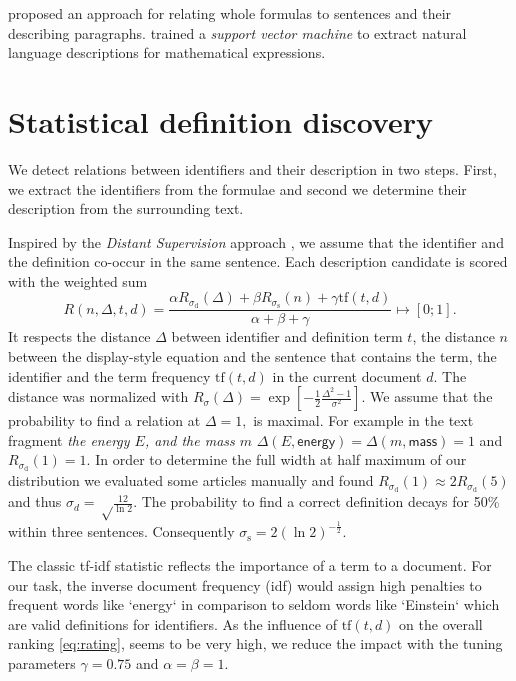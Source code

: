 \documentclass[runningheads]{llncs}
\begin{document}
\citeauthor{Quoc2010} \cite{Quoc2010} proposed an approach for
relating whole formulas to sentences and their describing paragraphs.
\citeauthor{Yokoi} \cite{Yokoi} trained a \emph{support vector machine} to extract
natural language descriptions for mathematical expressions.


\section{Statistical definition discovery}

We detect relations between identifiers and their description in two steps.
First, we extract the identifiers from the formulae and
second we determine their description from the surrounding text.

Inspired by the \emph{Distant Supervision} approach \cite{Mintz2008},
we assume that the identifier and the definition co-occur in the same sentence.
Each description candidate is scored with the weighted sum
\begin{equation} \label{eq:rating}
R(n,\Delta,t,d)=\frac{\alpha{R}_{\sigma_\mathrm d}(\Delta)
+\beta{R}_{\sigma_\mathrm s}(n)
+\gamma\mathrm{tf}(t,d)}{\alpha+\beta+\gamma} \mapsto [0;1].
\end{equation}
It respects the distance $\Delta$ between identifier and definition term $t$, the distance $n$ between the display-style equation and the sentence that contains the term, the identifier and the term frequency $\mathrm{tf}(t,d)$ in the current document $d$.
The distance was normalized with $R_\sigma(\Delta)= \exp\left[-\frac{1}{2}\frac{\Delta^2-1}{\sigma^2}\right].$
We assume that the probability to find a relation at $\Delta=1,$ is maximal.  For example in the text fragment \emph{the energy $E$, and the mass $m$} $\Delta(E,\textsf{energy})=\Delta(m,\textsf{mass})=1$ and $R_{\sigma_\mathrm d}(1)=1.$  
In order to determine the full width at half maximum of our distribution we evaluated some articles manually and found $R_{\sigma_\mathrm d}(1)\approx 2 R_{\sigma_\mathrm d}(5)$ and thus 
$\sigma_d=\sqrt\frac{12}{\ln 2}$.
The probability to find a correct definition decays for 50\% within three sentences.
Consequently  $\sigma_\mathrm s=2\left({\ln 2}\right)^{-\frac{1}{2}}$.

The classic tf-idf \cite{Salton86} statistic reflects the importance of a term to a document.
For our task, the inverse document frequency (idf) would assign high penalties to frequent words like `energy` in comparison to seldom words like `Einstein` which are valid definitions for identifiers.
As the influence of $\mathrm{tf}(t,d)$ on the overall ranking \ref{eq:rating}, seems to be very high, we reduce the impact with the tuning parameters $\gamma=0.75$ and $\alpha = \beta = 1$.
\end{document}
